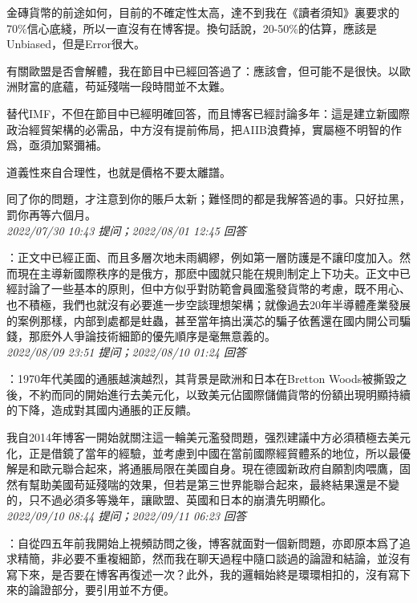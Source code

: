 \documentclass[twocolumn]{ctexart}
\begin{document}
金磚貨幣的前途如何，目前的不確定性太高，達不到我在《讀者須知》裏要求的70\%信心底綫，所以一直沒有在博客提。換句話說，20-50\%的估算，應該是Unbiased，但是Error很大。

有關歐盟是否會解體，我在節目中已經回答過了：應該會，但可能不是很快。以歐洲財富的底蘊，苟延殘喘一段時間並不太難。

替代IMF，不但在節目中已經明確回答，而且博客已經討論多年：這是建立新國際政治經貿架構的必需品，中方沒有提前佈局，把AIIB浪費掉，實屬極不明智的作爲，亟須加緊彌補。

道義性來自合理性，也就是價格不要太離譜。


囘了你的問題，才注意到你的賬戶太新；難怪問的都是我解答過的事。只好拉黑，罰你再等六個月。
\\

\textit{\hfill\noindent\small 2022/07/30 10:43 提问；2022/08/01 12:45 回答}

：正文中已經正面、而且多層次地未雨綢繆，例如第一層防護是不讓印度加入。然而現在主導新國際秩序的是俄方，那麽中國就只能在規則制定上下功夫。正文中已經討論了一些基本的原則，但中方似乎對防範會員國濫發貨幣的考慮，既不用心、也不積極，我們也就沒有必要進一步空談理想架構；就像過去20年半導體產業發展的案例那樣，内部到處都是蛀蟲，甚至當年搞出漢芯的騙子依舊還在國内開公司騙錢，那麽外人爭論技術細節的優先順序是毫無意義的。
\\

\textit{\hfill\noindent\small 2022/08/09 23:51 提问；2022/08/10 01:24 回答}

：1970年代美國的通脹越演越烈，其背景是歐洲和日本在Bretton Woods被撕毀之後，不約而同的開始進行去美元化，以致美元佔國際儲備貨幣的份額出現明顯持續的下降，造成對其國内通脹的正反饋。

我自2014年博客一開始就關注這一輪美元濫發問題，强烈建議中方必須積極去美元化，正是借鏡了當年的經驗，並考慮到中國在當前國際經貿體系的地位，所以最優解是和歐元聯合起來，將通脹局限在美國自身。現在德國新政府自願割肉喂鷹，固然有幫助美國苟延殘喘的效果，但若是第三世界能聯合起來，最終結果還是不變的，只不過必須多等幾年，讓歐盟、英國和日本的崩潰先明顯化。
\\

\textit{\hfill\noindent\small 2022/09/10 08:44 提问；2022/09/11 06:23 回答}

：自從四五年前我開始上視頻訪問之後，博客就面對一個新問題，亦即原本爲了追求精簡，非必要不重複細節，然而我在聊天過程中隨口談過的論證和結論，並沒有寫下來，是否要在博客再復述一次？此外，我的邏輯始終是環環相扣的，沒有寫下來的論證部分，要引用並不方便。
\end{document}
